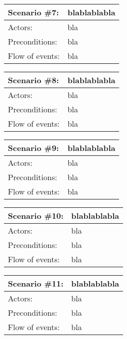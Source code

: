 \begin{tabular}{| l | l |}
	\hline
	Scenario \#7: & blablablabla \\ \hline
	Actors: & bla \\ \hline
	Preconditions: & bla \\ \hline
	Flow of events: & bla \\ \hline
\end{tabular}

\begin{tabular}{| l | l |}
	\hline
	Scenario \#8: & blablablabla \\ \hline
	Actors: & bla \\ \hline
	Preconditions: & bla \\ \hline
	Flow of events: & bla \\ \hline
\end{tabular}

\begin{tabular}{| l | l |}
	\hline
	Scenario \#9: & blablablabla \\ \hline
	Actors: & bla \\ \hline
	Preconditions: & bla \\ \hline
	Flow of events: & bla \\ \hline
\end{tabular}

\begin{tabular}{| l | l |}
	\hline
	Scenario \#10: & blablablabla \\ \hline
	Actors: & bla \\ \hline
	Preconditions: & bla \\ \hline
	Flow of events: & bla \\ \hline
\end{tabular}

\begin{tabular}{| l | l |}
	\hline
	Scenario \#11: & blablablabla \\ \hline
	Actors: & bla \\ \hline
	Preconditions: & bla \\ \hline
	Flow of events: & bla \\ \hline
\end{tabular}